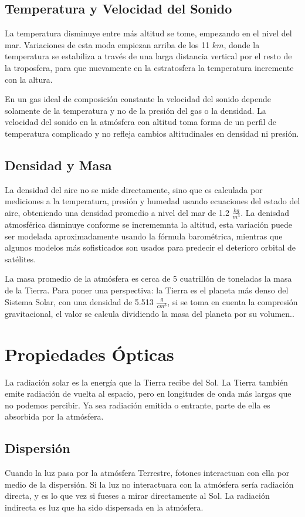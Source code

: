 \documentclass{article} %
\begin{document}
	\subsection{Temperatura y Velocidad del Sonido}
     La temperatura disminuye entre más altitud se tome, empezando en el nivel del mar. Variaciones de esta moda empiezan arriba de los 11 $km$, donde la temperatura se estabiliza a través de una larga distancia vertical por el resto de la troposfera, para que nuevamente en la estratosfera la temperatura incremente con la altura.
     
	En un gas ideal de composición constante la velocidad del sonido depende solamente de la temperatura y no de la presión del gas o la densidad. La velocidad del sonido en la atmósfera con altitud toma forma de un perfil de temperatura complicado y no refleja cambios altitudinales en densidad ni presión.
	
    \subsection{Densidad y Masa}
    La densidad del aire no se mide directamente, sino que es calculada por mediciones a la temperatura, presión y humedad usando ecuaciones del estado del aire, obteniendo una densidad promedio a nivel del mar de 1.2 $\frac{kg}{m^3}$. La denisdad atmosférica disminuye conforme se incrememnta la altitud, esta variación puede ser modelada aproximadamente usando la fórmula barométrica, mientras que algunos modelos más sofisticados son usados para predecir el deterioro orbital de satélites. 
    
    La masa promedio de la atmósfera es cerca de 5 cuatrillón de toneladas la masa de la Tierra. Para poner una perspectiva: la Tierra es el planeta más denso del Sistema Solar, con una densidad de 5.513 $\frac{g}{cm^3}$, si se toma en cuenta la compresión gravitacional, el valor se calcula dividiendo la masa del planeta por su volumen..
     
\section{Propiedades Ópticas}
    La radiación solar es la energía que la Tierra recibe del Sol. La Tierra también emite radiación de vuelta al espacio, pero en longitudes de onda más largas que no podemos percibir. Ya sea radiación emitida o entrante, parte de ella es absorbida por la atmósfera. 
    
    \subsection{Dispersión}
    Cuando la luz pasa por la atmósfera Terrestre, fotones interactuan con ella por medio de la dispersión. Si la luz no interactuara con la atmósfera sería radiación directa, y es lo que vez si fueses a mirar directamente al Sol. La radiación indirecta es luz que ha sido dispersada en la atmósfera.
    
\end{document}
